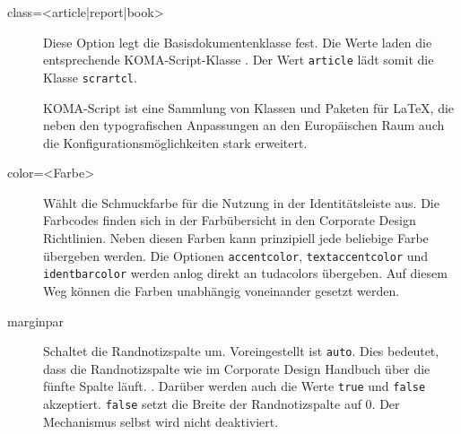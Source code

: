 \documentclass[
	ngerman,
	accentcolor=9c,%
	]{tudapub}
\let\code\texttt
\let\pck\textsf
\begin{document}
\begin{description}
	\item[class=<article|report|book>] Diese Option legt die Basisdokumentenklasse fest. Die Werte laden die entsprechende KOMA-Script-Klasse \cite{scrguide}. Der Wert \code{article} lädt somit die Klasse \code{scrartcl}.

	KOMA-Script ist eine Sammlung von Klassen und Paketen für \LaTeX, die neben den typografischen Anpassungen an den Europäischen Raum auch die Konfigurationsmöglichkeiten stark erweitert.
	\item[color=<Farbe>] Wählt die Schmuckfarbe für die Nutzung in der Identitätsleiste aus. Die Farbcodes finden sich in der Farbübersicht in den Corporate Design Richtlinien. Neben diesen Farben kann prinzipiell jede beliebige Farbe übergeben werden. Die Optionen \code{accentcolor}, \code{textaccentcolor} und \code{identbarcolor} werden anlog direkt an \pck{tudacolors} übergeben. Auf diesem Weg können die Farben unabhängig voneinander gesetzt werden.
	\item[marginpar] Schaltet die Randnotizspalte um. Voreingestellt ist \code{auto}. Dies bedeutet, dass die Randnotizspalte wie im Corporate Design Handbuch über die fünfte Spalte läuft.  .
	Darüber werden auch die Werte \code{true} und \code{false} akzeptiert. \code{false} setzt die Breite der Randnotizspalte auf 0. Der Mechanismus selbst wird nicht deaktiviert.


\end{description}
\end{document}
